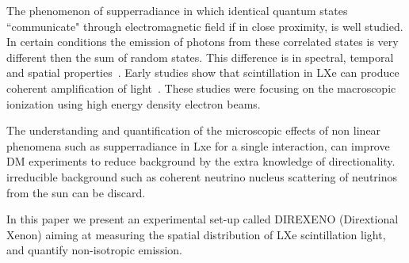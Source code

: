 The phenomenon of supperradiance in which identical quantum states ``communicate" through electromagnetic field if in close proximity, is well studied. In certain conditions the emission of photons from these correlated states is very different then the sum of random states. This difference is in spectral, temporal and spatial properties~\cite{DickeSR,GROSS1982301}. Early studies show that scintillation in LXe can produce coherent amplification of light~\cite{BasovSRTheory,MiesSRExp}. These studies were focusing on the macroscopic ionization using high energy density electron beams. 

The understanding and quantification of the microscopic effects of non linear phenomena such as supperradiance in Lxe for a single interaction, can improve DM experiments to reduce background by the extra knowledge of directionality. irreducible background such as coherent neutrino nucleus scattering of neutrinos from the sun can be discard.

In this paper we present an experimental set-up called DIREXENO (Dirextional Xenon) aiming at measuring the spatial distribution of LXe scintillation light, and quantify non-isotropic emission.   